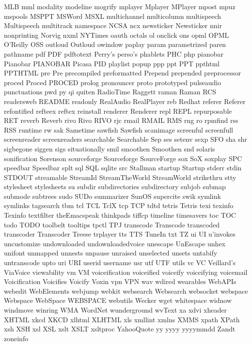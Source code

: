 MLB
mml
modality
modeline
mogrify
mplayer
Mplayer
MPlayer
mpost
mpuz
mspools
MSPPT
MSWord
MSXL
multichannel
multicolumn
multispeech
Multispeech
multitrack
namespace
NCSA
ncx
newsticker
Newsticker
nnir
nonprinting
Norvig
nxml
NYTimes
oauth
octals
ol
onclick
ons
opml
OPML
O'Reilly
OSS
outloud
Outloud
owindow
paplay
param
parametrized
paren
pathname
pdf
PDF
pdftotext
Perry's
perso's
phablets
PHC
php
pianobar
Pianobar
PIANOBAR
Picasa
PID
playlist
popup
ppp
ppt
PPT
ppthtml
PPTHTML
pre
Pre
precompiled
preformatted
Prepend
prepended
preprocessor
proced
Proced
PROCED
prolog
pronouncer
proto
prototyped
pulseaudio
punctuations
pwd
py
qi
quiten
RadioTime
Raggett
raman
Raman
RCS
readersweb
README
readonly
RealAudio
RealPlayer
reb
Redhat
referer
Referer
refontified
refteex
reftex
reinstall
renderer
Renderer
repl
REPL
repurposable
RET
reverb
Reverb
rivo
Rivo
RIVO
rjc
rmail
RMAIL
RMS
rng
ro
rpmfind
rss
RSS
runtime
rw
sak
Sametime
sawfish
Sawfish
scanimage
screenful
screenfull
screenreader
screenreaders
searchable
Searchable
Sep
ses
setenv
sexp
SFO
sha
shr
sigbegone
siggen
sigs
situationally
smil
smoothen
Smoothen
snd
solaris
sonification
Sorenson
sourceforge
Sourceforge
SourceForge
sox
SoX
soxplay
SPC
speedbar
Speedbar
splt
sql
SQL
sqlite
src
Stallman
startup
Startup
stderr
stdin
STDOUT
streamable
StreamId
StreamTheWorld
StreamWorld
strikethru
stty
stylesheet
stylesheets
su
subdir
subdirectories
subdirectory
subjob
submap
submode
subtrees
sudo
SUDo
summarizer
SunOS
supercite
swik
symlink
symlinks
tagsearch
tbm
tcl
TCL
TclX
tcp
TCP
tdtd
tetris
Tetris
texi
texinfo
Texinfo
textfilter
theEmacspeak
thinkpads
tiffcp
timeline
timesavers
toc
TOC
todo
TODO
toolbelt
tooltips
tpctl
TPJ
transcode
Transcode
transcoded
transcoder
Transcoder
Treese
trplayer
tts
TTS
TuneIn
txt
TZ
ui
UI
u'invokes
uncustomize
undownloaded
undownloadedvoice
unescape
UnEscape
unhex
unifont
unmapped
unnests
unpause
unraised
unselected
unsets
untabify
untranscode
upto
uri
URI
userid
username
usr
utf
UTF
utils
vc
VC
Veillard's
ViaVoice
viewability
vm
VM
voiceification
voiceified
voiceify
voiceifying
voicemail
Voicification
Voicifies
Voicify
Voxin
vpn
VPN
wav
wdired
wearables
WebAPIs
webedit
WebElements
webjump
webkit
websearch
Websearch
websocket
webspace
Webspace
WebSpace
WEBSPACE
webutils
Wecker
wget
whitespace
widnow
windmove
winring
WMA
WordNet
wunderground
wvText
xa
xdvi
xheader
XHTML
xkcd
XKCD
xlhtml
XLHTML
xls
xmllint
xmlns
XMMS
xpath
XPath
xsh
XSH
xsl
XSL
xslt
XSLT
xsltproc
YahooQuote
yy
yyyy
yyyymmdd
Zandt
zoneinfo

